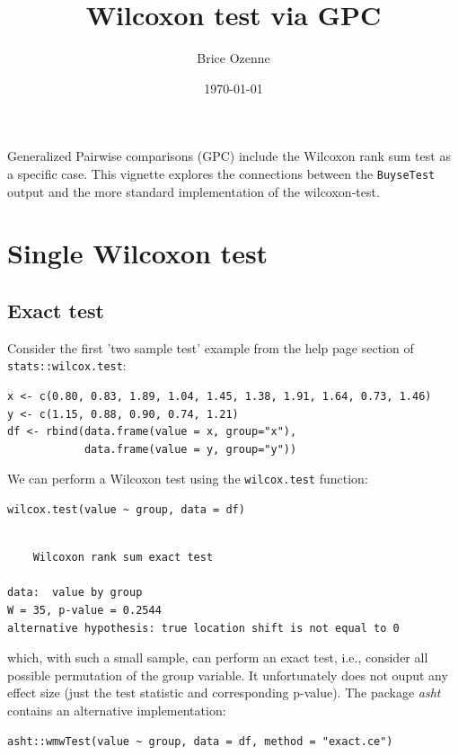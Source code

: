 \documentclass[12pt]{article}
\author{Brice Ozenne}
\date{\today}
\title{Wilcoxon test via GPC}
\begin{document}
\maketitle
Generalized Pairwise comparisons (GPC) include the Wilcoxon rank sum
test as a specific case. This vignette explores the connections
between the \texttt{BuyseTest} output and the more standard implementation of
the wilcoxon-test.


\section{Single Wilcoxon test}
\label{sec:org031a3ea}

\subsection{Exact test}
\label{sec:org54c347f}

Consider the first 'two sample test' example from the help page section of \texttt{stats::wilcox.test}:
\lstset{language=r,label= ,caption= ,captionpos=b,numbers=none}
\begin{lstlisting}
x <- c(0.80, 0.83, 1.89, 1.04, 1.45, 1.38, 1.91, 1.64, 0.73, 1.46)
y <- c(1.15, 0.88, 0.90, 0.74, 1.21)
df <- rbind(data.frame(value = x, group="x"),
            data.frame(value = y, group="y"))
\end{lstlisting}

\noindent We can perform a Wilcoxon test using the \texttt{wilcox.test} function:

\lstset{language=r,label= ,caption= ,captionpos=b,numbers=none}
\begin{lstlisting}
wilcox.test(value ~ group, data = df)
\end{lstlisting}

\begin{verbatim}

	Wilcoxon rank sum exact test

data:  value by group
W = 35, p-value = 0.2544
alternative hypothesis: true location shift is not equal to 0
\end{verbatim}


which, with such a small sample, can perform an exact test, i.e.,
consider all possible permutation of the group variable. It
unfortunately does not ouput any effect size (just the test statistic
and corresponding p-value). The package \emph{asht} contains an alternative
implementation:
\lstset{language=r,label= ,caption= ,captionpos=b,numbers=none}
\begin{lstlisting}
asht::wmwTest(value ~ group, data = df, method = "exact.ce")
\end{lstlisting}
\end{document}
